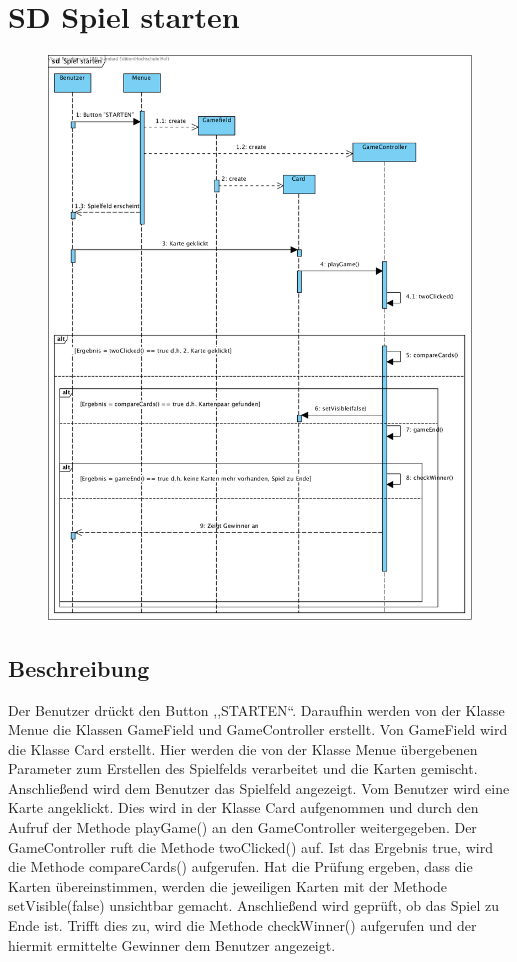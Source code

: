 \clearpage
\section{SD Spiel starten}
\begin{figure}[h!]
	\centering
    \includegraphics[width=15cm]{./SD_Spiel_starten.png}
	\label{layout_gesamt}
\end{figure}
\subsection{Beschreibung}
Der Benutzer drückt den Button ,,STARTEN``. Daraufhin werden von der Klasse Menue die Klassen GameField und GameController erstellt. Von GameField wird die Klasse Card erstellt. Hier werden die von der Klasse Menue übergebenen Parameter zum Erstellen des Spielfelds verarbeitet und die Karten gemischt. Anschließend wird dem Benutzer das Spielfeld angezeigt. Vom Benutzer wird eine Karte angeklickt. Dies wird in der Klasse Card aufgenommen und durch den Aufruf der Methode playGame() an den GameController weitergegeben. Der GameController ruft die Methode twoClicked() auf. Ist das Ergebnis true, wird die Methode compareCards() aufgerufen. Hat die Prüfung ergeben, dass die Karten übereinstimmen, werden die jeweiligen Karten mit der Methode setVisible(false) unsichtbar gemacht. Anschließend wird geprüft, ob das Spiel zu Ende ist. Trifft dies zu, wird die Methode checkWinner() aufgerufen und der hiermit ermittelte Gewinner dem Benutzer angezeigt. 





